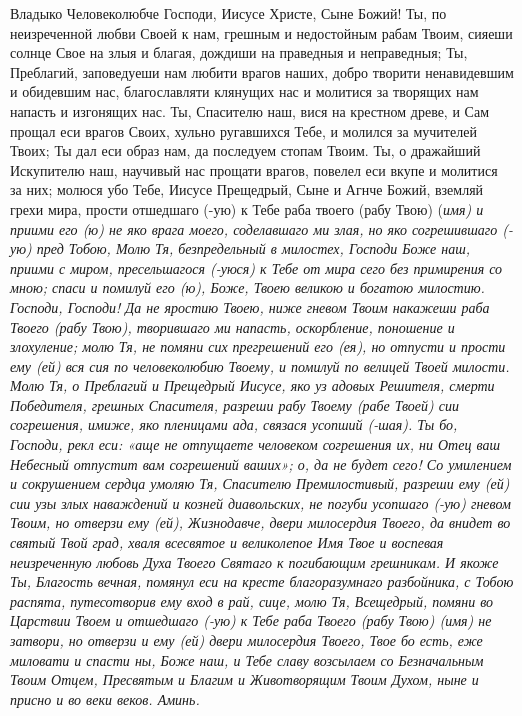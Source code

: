 Владыко Человеколюбче Господи, Иисусе Христе, Сыне Божий! Ты, по неизреченной любви Своей к нам, грешным и недостойным рабам Твоим, сияеши солнце Свое на злыя и благая, дождиши на праведныя и неправедныя; Ты, Преблагий, заповедуеши нам любити врагов наших, добро творити ненавидевшим и обидевшим нас, благославляти клянущих нас и молитися за творящих нам напасть и изгонящих нас. Ты, Спасителю наш, вися на крестном древе, и Сам прощал еси врагов Своих, хульно ругавшихся Тебе, и молился за мучителей Твоих; Ты дал еси образ нам, да последуем стопам Твоим. Ты, о дражайший Искупителю наш, научивый нас прощати врагов, повелел еси вкупе и молитися за них; молюся убо Тебе, Иисусе Прещедрый, Сыне и Агнче Божий, вземляй грехи мира, прости отшедшаго (-ую) к Тебе раба твоего (рабу Твою) (\itshape имя\normalfont{}) и приими его (ю) не яко врага моего, соделавшаго ми злая, но яко согрешившаго (-ую) пред Тобою, Молю Тя, безпредельный в милостех, Господи Боже наш, приими с миром, пресельшагося (-уюся) к Тебе от мира сего без примирения со мною; спаси и помилуй его (ю), Боже, Твоею великою и богатою милостию. Господи, Господи! Да не яростию Твоею, ниже гневом Твоим накажеши раба Твоего (рабу Твою), творившаго ми напасть, оскорбление, поношение и злохуление; молю Тя, не помяни сих прегрешений его (ея), но отпусти и прости ему (ей) вся сия по человеколюбию Твоему, и помилуй по велицей Твоей милости. Молю Тя, о Преблагий и Прещедрый Иисусе, яко уз адовых Решителя, смерти Победителя, грешных Спасителя, разреши рабу Твоему (рабе Твоей) сии согрешения, имиже, яко пленицами ада, связася усопший (-шая). Ты бо, Господи, рекл еси: «аще не отпущаете человеком согрешения их, ни Отец ваш Небесный отпустит вам согрешений ваших»; о, да не будет сего! Со умилением и сокрушением сердца умоляю Тя, Спасителю Премилостивый, разреши ему (ей) сии узы злых наваждений и козней диавольских, не погуби усопшаго (-ую) гневом Твоим, но отверзи ему (ей), Жизнодавче, двери милосердия Твоего, да внидет во святый Твой град, хваля всесвятое и великолепое Имя Твое и воспевая неизреченную любовь Духа Твоего Святаго к погибающим грешникам. И якоже Ты, Благость вечная, помянул еси на кресте благоразумнаго разбойника, с Тобою распята, путесотворив ему вход в рай, сице, молю Тя, Всещедрый, помяни во Царствии Твоем и отшедшаго (-ую) к Тебе раба Твоего (рабу Твою) (\itshape имя\normalfont{}) не затвори, но отверзи и ему (ей) двери милосердия Твоего, Твое бо есть, еже миловати и спасти ны, Боже наш, и Тебе славу возсылаем со Безначальным Твоим Отцем, Пресвятым и Благим и Животворящим Твоим Духом, ныне и присно и во веки веков. Аминь. 
\longpage[2]{}\mychapterending

